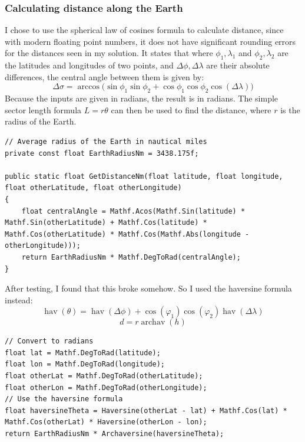 \documentclass{article}
\begin{document}
\subsubsection{Calculating distance along the Earth}
I chose to use the spherical law of cosines formula to calculate distance, since with modern floating point numbers, it does not have significant rounding errors for the distances seen in my solution.
It states that where $\phi _{1}, \lambda _{1}$ and $\phi _{2}, \lambda _{2}$ are the latitudes and longitudes of two points, and ${\Delta \phi, \Delta \lambda}$ are their absolute differences, the central angle between them is given by:
\[ \Delta \sigma =\arccos {\bigl (}\sin \phi _{1}\sin \phi _{2}+\cos \phi _{1}\cos \phi _{2}\cos(\Delta \lambda ){\bigr )} \] 
Because the inputs are given in radians, the result is in radians.
The simple sector length formula $L=r\theta$ can then be used to find the distance, where $r$ is the radius of the Earth\cite{greatcircledistance}.
\lstset{style=csharp}
\begin{lstlisting}[label={lst:getdistancenm},caption=Calculating great-circle distance using the spherical law of cosines]
// Average radius of the Earth in nautical miles
private const float EarthRadiusNm = 3438.175f;

public static float GetDistanceNm(float latitude, float longitude, float otherLatitude, float otherLongitude)
{
    float centralAngle = Mathf.Acos(Mathf.Sin(latitude) * Mathf.Sin(otherLatitude) + Mathf.Cos(latitude) * Mathf.Cos(otherLatitude) * Mathf.Cos(Mathf.Abs(longitude - otherLongitude)));
    return EarthRadiusNm * Mathf.DegToRad(centralAngle);
}
\end{lstlisting}

After testing, I found that this broke somehow.
So I used the haversine formula instead:
\[ \operatorname{hav}(\theta ) = \operatorname{hav} (\Delta \phi) + \cos(\varphi _{1})\cos (\varphi _{2})\operatorname{hav}(\Delta \lambda) \] 
\[ d = r \operatorname{archav} (h) \]

\begin{lstlisting}[label={lst:getdistancenmhaversine},caption=Calculating great-circle distance using the haversine formula]
// Convert to radians
float lat = Mathf.DegToRad(latitude);
float lon = Mathf.DegToRad(longitude);
float otherLat = Mathf.DegToRad(otherLatitude);
float otherLon = Mathf.DegToRad(otherLongitude);
// Use the haversine formula
float haversineTheta = Haversine(otherLat - lat) + Mathf.Cos(lat) * Mathf.Cos(otherLat) * Haversine(otherLon - lon);
return EarthRadiusNm * Archaversine(haversineTheta);
\end{lstlisting}
\end{document}

